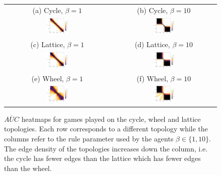 \documentclass[letterpaper]{article}
\begin{document}
\begin{figure}[!h]
    \begin{tabular}{cc}
        {\footnotesize (a) Cycle, $\beta=1$} & {\footnotesize (b) Cycle, $\beta=10$} \\
        \includegraphics[width=0.21\textwidth]{"heatmap/Cycle_01"} &
        \includegraphics[width=0.21\textwidth]{"heatmap/Cycle_10"} \\
        {\footnotesize (c) Lattice, $\beta=1$} & {\footnotesize (d) Lattice, $\beta=10$} \\
        \includegraphics[width=0.21\textwidth]{"heatmap/Lattice_01"} &
        \includegraphics[width=0.21\textwidth]{"heatmap/Lattice_10"} \\
        {\footnotesize (e) Wheel, $\beta=1$} & {\footnotesize (f) Wheel, $\beta=10$} \\
        \includegraphics[width=0.21\textwidth]{"heatmap/Wheel_01"} &
        \includegraphics[width=0.21\textwidth]{"heatmap/Wheel_10"}
    \end{tabular}
    \caption{\label{fig:fixed}
    $\overline{AUC}$ heatmaps for games played on the cycle, wheel and lattice topologies. Each row corresponds to a different topology while the columns refer to the rule parameter used by the agents $\beta\in\{1,10\}$. The edge density of the topologies increases down the column, i.e. the cycle has fewer edges than the lattice which has fewer edges than the wheel. \\}
\end{figure}
\end{document}
